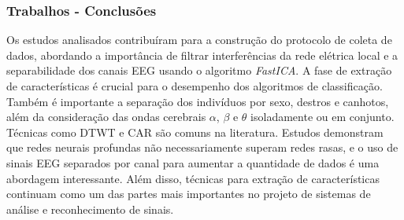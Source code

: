\begin{frame}
	\frametitle{Trabalhos - Conclusões}
	\par Os estudos analisados contribuíram para a construção do protocolo de coleta de dados, abordando a importância de filtrar interferências da rede elétrica local e a separabilidade dos canais EEG usando o algoritmo \textit{FastICA}. A fase de extração de características é crucial para o desempenho dos algoritmos de classificação. Também é importante a separação dos indivíduos por sexo, destros e canhotos, além da consideração das ondas cerebrais $\alpha$, $\beta$ e $\theta$ isoladamente ou em conjunto. Técnicas como DTWT e CAR são comuns na literatura. Estudos demonstram que redes neurais profundas não necessariamente superam redes rasas, e o uso de sinais EEG separados por canal para aumentar a quantidade de dados é uma abordagem interessante. Além disso, técnicas para extração de características continuam como um das partes mais importantes no projeto de sistemas de análise e reconhecimento de sinais.
	
\end{frame}
